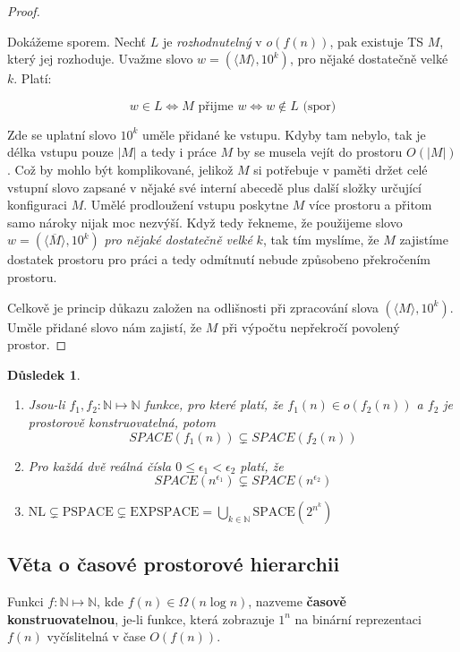 \documentclass[11pt]{report} %
\newcommand{\N}{\mathbb{N}}
\newtheorem{implication}{Důsledek}[section]
\begin{document}
\begin{proof}
\begin{enumerate}
		Dokážeme sporem. Nechť $L$ je \textit{rozhodnutelný} v $o(f(n))$, pak existuje TS $M$, který jej rozhoduje. Uvažme slovo $w = (\langle M \rangle, 10^k)$, pro nějaké dostatečně velké $k$. Platí:

		$$w \in L \Leftrightarrow M \text{ přijme } w \Leftrightarrow w \notin L \text{ (spor)}$$

		
		Zde se uplatní slovo $10^k$ uměle přidané ke vstupu. Kdyby tam nebylo, tak je délka vstupu pouze $|M|$ a tedy i práce $M$ by se musela vejít do prostoru $O(|M|)$. Což by mohlo být komplikované, jelikož $M$ si potřebuje v paměti držet celé vstupní slovo zapsané v nějaké své interní abecedě plus další složky určující konfiguraci $M$. Umělé prodloužení vstupu poskytne $M$ více prostoru a přitom samo nároky nijak moc nezvýší. Když tedy řekneme, že použijeme slovo $w = (\langle \overline{M} \rangle, 10^k)$ \textit{pro nějaké dostatečně velké} $k$, tak tím myslíme, že $M$ zajistíme dostatek prostoru pro práci a tedy odmítnutí nebude způsobeno překročením prostoru.
	\end{enumerate}
	
	Celkově je princip důkazu založen na odlišnosti při zpracování slova $(\langle M \rangle, 10^k)$. Uměle přidané slovo nám zajistí, že $M$ při výpočtu nepřekročí povolený prostor.
\end{proof}
	
\begin{implication}	~
	\begin{enumerate}
		\item Jsou-li $f_1, f_2 : \N \mapsto \N$ funkce, pro které platí, že $f_1(n) \in o(f_2(n))$ a $f_2$ je prostorově konstruovatelná, potom 
			$$SPACE(f_1(n)) \subsetneq SPACE(f_2(n))$$
		\item Pro každá dvě reálná čísla $0 \leq \epsilon_1 < \epsilon_2$ platí, že
			$$SPACE(n^{\epsilon_1}) \subsetneq SPACE(n^{\epsilon_2})$$
		\item $\text{NL} \subsetneq \text{PSPACE} \subsetneq \text{EXPSPACE} = \bigcup_{k\in\N} \text{SPACE}(2^{n^k})$
	\end{enumerate}

\end{implication}

\subsection{Věta o časové prostorové hierarchii}
Funkci $f : \N \mapsto \N$, kde $f(n) \in \Omega(n\log n)$, nazveme \textbf{časově konstruovatelnou}, je-li funkce, která zobrazuje $1^n$ na binární reprezentaci $f(n)$ vyčíslitelná v čase $O(f(n))$.
\end{document}
